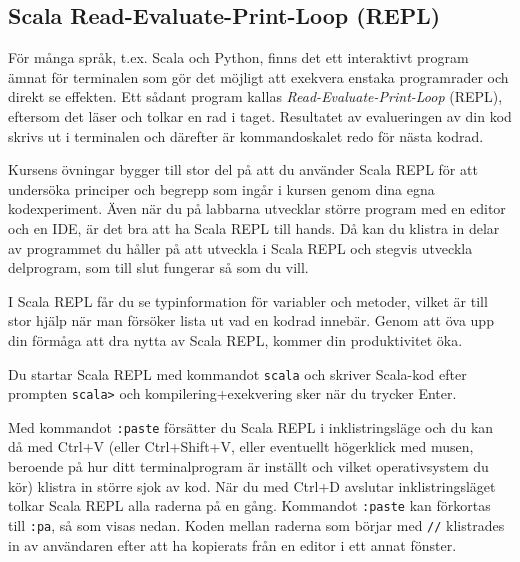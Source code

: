 \subsection{Scala Read-Evaluate-Print-Loop (REPL)}\label{appendix:compile:REPL}

För många språk, t.ex. Scala och Python, finns det ett interaktivt program ämnat för terminalen som gör det möjligt att exekvera enstaka programrader och direkt se effekten. Ett sådant program kallas \textit{Read-Evaluate-Print-Loop} (REPL), eftersom det läser  och tolkar en rad i taget. Resultatet av evalueringen av din kod skrivs ut i terminalen och därefter är kommandoskalet redo för nästa kodrad.

Kursens övningar bygger till stor del på att du använder Scala REPL för att undersöka principer och begrepp som ingår i kursen genom dina egna kodexperiment. Även när du på labbarna utvecklar större program med en editor och en IDE, är det bra att ha Scala REPL till hands. Då kan du klistra in delar av programmet du håller på att utveckla i Scala REPL och stegvis utveckla delprogram, som till slut fungerar så som du vill.

I Scala REPL får du se typinformation för variabler och metoder, vilket är till stor hjälp när man försöker lista ut vad en kodrad innebär. Genom att öva upp din förmåga att dra nytta av Scala REPL, kommer din produktivitet öka.

Du startar Scala REPL med kommandot \texttt{scala} och skriver Scala-kod efter prompten \texttt{scala>} och kompilering+exekvering sker när du trycker Enter.

Med kommandot \texttt{:paste} försätter du Scala REPL i inklistringsläge  och du kan då med Ctrl+V (eller Ctrl+Shift+V, eller eventuellt högerklick med musen, beroende på hur ditt terminalprogram är inställt och vilket operativsystem du kör) klistra in större sjok av kod. När du med Ctrl+D avslutar inklistringsläget tolkar Scala REPL alla raderna på en gång. Kommandot  \texttt{:paste} kan förkortas till  \texttt{:pa}, så som visas nedan. Koden mellan raderna som börjar med \texttt{//} klistrades in av användaren efter att ha kopierats från en editor i ett annat fönster.

